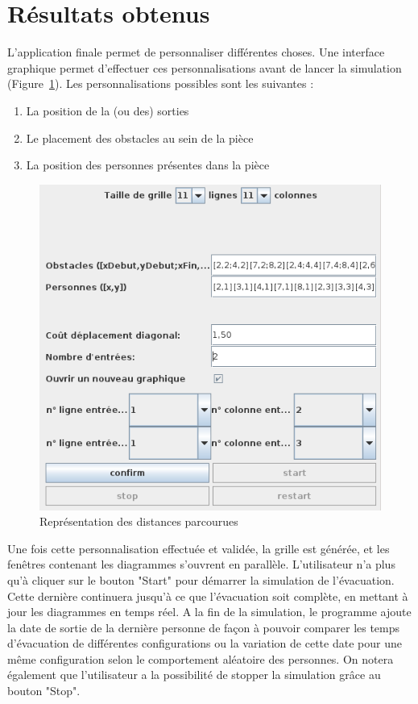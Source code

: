 \section{Résultats obtenus}
	L'application finale permet de personnaliser différentes choses. Une interface graphique permet d'effectuer ces personnalisations avant de lancer la simulation (Figure~\ref{fig:personnalisation}). Les personnalisations possibles sont les suivantes :
	
	\begin{enumerate}
		\item La position de la (ou des) sorties
		\item Le placement des obstacles au sein de la pièce
		\item La position des personnes présentes dans la pièce
	\end{enumerate}		

	\begin{figure}[H]
	\centering
	\includegraphics[scale=0.7]{imagesPNG/personnalisation.png}
	\caption{Représentation des distances parcourues\label{fig:personnalisation}}
	\end{figure}
		
	Une fois cette personnalisation effectuée et validée, la grille est générée, et les fenêtres contenant les diagrammes s'ouvrent en parallèle. L'utilisateur n'a plus qu'à cliquer sur le bouton "Start" pour démarrer la simulation de l'évacuation. Cette dernière continuera jusqu'à ce que l'évacuation soit complète, en mettant à jour les diagrammes en temps réel. A la fin de la simulation, le programme ajoute la date de sortie de la dernière personne de façon à pouvoir comparer les temps d'évacuation de différentes configurations ou la variation de cette date pour une même configuration selon le comportement aléatoire des personnes. On notera également que l'utilisateur a la possibilité de stopper la simulation grâce au bouton "Stop". \\
	

